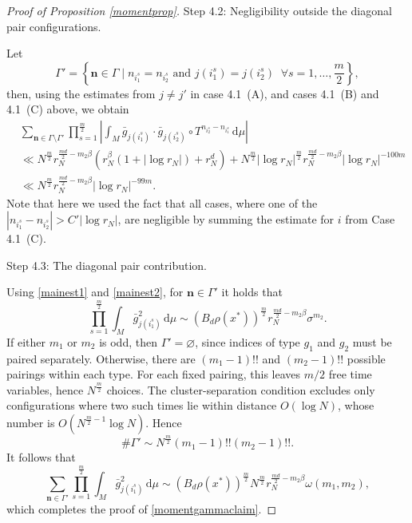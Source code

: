 \documentclass[11pt,twoside,a4paper,reqno]{amsart}
\renewcommand{\d}{\, \text{d}}
\begin{document}
\begin{proof}[Proof of Proposition \ref{momentprop}]
Step 4.2: Negligibility outside the diagonal pair configurations.

Let
\begin{equation*}
\Gamma'=\left\{\textbf{n} \in \Gamma \;|\; n_{i^s_1}=n_{i^s_2} \text{ and } j(i^s_1)=j(i^s_2) \;\; \forall s=1,\ldots,\frac{m}{2}\right\},
\end{equation*}
then, using the estimates from $j\neq j'$ in case 4.1~(A), and cases 4.1~(B) and 4.1~(C) above, we obtain
\begin{align*}
&\sum_{\textbf{n} \in \Gamma\setminus \Gamma'} \prod_{s=1}^{\frac{m}{2}} \left|\int_M \bar{g}_{j(i^s_1)} \cdot \bar{g}_{j(i^s_2)} \circ T^{n_{i^s_2}-n_{i^s_1}} \d\mu\right|\\
&\ll N^{\frac{m}{2}} r_N^{\frac{md}{2}-m_2 \beta}\left(r_N^\beta(1+|\log r_N|)+r_N^d \right)
+ N^{\frac{m}{2}} \left|\log r_N \right|^{\frac{m}{2}} r_N^{\frac{md}{2} - m_2 \beta} \left|\log r_N \right|^{-100m}\\
&\ll N^{\frac{m}{2}} r_N^{\frac{md}{2}-m_2 \beta} \left|\log r_N \right|^{-99m}.
\end{align*}
Note that here we used the fact that all cases, where one of the $|n_{i^s_1}-n_{i^s_2}|>C'|\log r_N|$, are negligible by summing the estimate for $i$ from Case 4.1~(C).




Step 4.3: The diagonal pair contribution.

Using \eqref{mainest1} and \eqref{mainest2}, for $\mathbf{n}\in \Gamma'$ it holds that
$$
\prod_{s=1}^{\frac{m}{2}} \int_M \bar{g}_{j(i^s_1)}^2 \d\mu\sim\left(B_d \rho(x^*)\right)^{\frac{m}{2}} r_N^{\frac{md}{2}-m_2\beta } \sigma^{m_2}.
$$
If either $m_1$ or $m_2$ is odd, then $\Gamma'=\varnothing$, since indices of type $g_1$ and $g_2$ must be paired separately. Otherwise, there are $(m_1-1)!!$ and $(m_2-1)!!$ possible pairings within each type. For each fixed pairing, this leaves $m/2$ free time variables, hence $N^{\frac{m}{2}}$ choices. The cluster-separation condition excludes only configurations where two such times lie within distance $O(\log N)$, whose number is $O(N^{\frac{m}{2}-1}\log N)$. Hence
$$\#\Gamma'\sim N^{\frac{m}{2}}(m_1-1)!!(m_2-1)!!.
$$
It follows that
$$
\sum_{\mathbf{n} \in \Gamma'} \prod_{s=1}^{\frac{m}{2}} \int_M \bar{g}_{j(i^s_1)}^2 \d\mu \sim \left(B_d \rho(x^*)\right)^{\frac{m}{2}} N^{\frac{m}{2}} r_N^{\frac{md}{2}-m_2\beta } \omega(m_1,m_2),
$$
which completes the proof of \eqref{momentgammaclaim}.
\end{proof}
\end{document}

